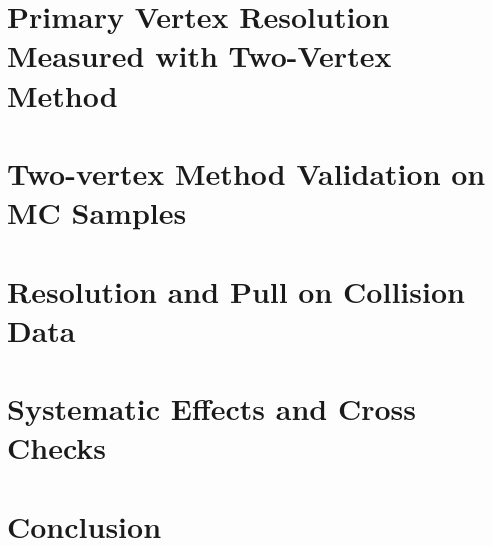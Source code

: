 \documentclass{cmspaper}
\begin{document}
\section{Primary Vertex Resolution Measured with Two-Vertex Method}
\label{sec:twovertex}


\section{Two-vertex Method Validation on MC Samples}
\label{sec:mcvalidation}

\pagebreak

\section{Resolution and Pull on Collision Data}
\label{sec:dataresults}

\pagebreak

\section{Systematic Effects and Cross Checks}
\label{sec:systematics}


\section{Conclusion}
\label{sec:conclusion}




\end{document}

